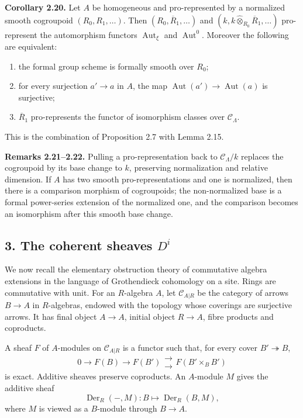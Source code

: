 \documentclass[11pt]{article}
\providecommand{\Aut}{\operatorname{Aut}}
\providecommand{\Der}{\operatorname{Der}}
\providecommand{\cC}{\mathcal C}
\begin{document}
\textbf{Corollary 2.20.}  Let \(A\) be homogeneous and pro-represented by a normalized smooth cogroupoid \((R_0,R_1,\ldots)\).  Then \((R_0,\overline R_1,\ldots)\) and \((k,k\widehat\otimes_{R_0}\overline R_1,\ldots)\) pro-represent the automorphism functors \(\Aut_\xi\) and \(\Aut^0\).  Moreover the following are equivalent:
\begin{enumerate}[label=\textup{(\roman*)}]
\item the formal group scheme is formally smooth over \(R_0\);
\item for every surjection \(a'\to a\) in \(A\), the map \(\Aut(a')\to\Aut(a)\) is surjective;
\item \(\overline R_1\) pro-represents the functor of isomorphism classes over \(\cC_\Lambda\).
\end{enumerate}
This is the combination of Proposition 2.7 with Lemma 2.15.

\textbf{Remarks 2.21--2.22.}  Pulling a pro-representation back to \(\cC_\Lambda/k\) replaces the cogroupoid by its base change to \(k\), preserving normalization and relative dimension.  If \(A\) has two smooth pro-representations and one is normalized, then there is a comparison morphism of cogroupoids; the non-normalized base is a formal power-series extension of the normalized one, and the comparison becomes an isomorphism after this smooth base change.

\subsection*{3. The coherent sheaves \(D^i\)}

We now recall the elementary obstruction theory of commutative algebra extensions in the language of Grothendieck cohomology on a site.  Rings are commutative with unit.  For an \(R\)-algebra \(A\), let \(\cC_{A|R}\) be the category of arrows \(B\to A\) in \(R\)-algebras, endowed with the topology whose coverings are surjective arrows.  It has final object \(A\to A\), initial object \(R\to A\), fibre products and coproducts.

A sheaf \(F\) of \(A\)-modules on \(\cC_{A|R}\) is a functor such that, for every cover \(B'\twoheadrightarrow B\),
\[
0\to F(B)\to F(B')\mathrel{\substack{\longrightarrow\\[-.6ex]\longrightarrow}} F(B'\times_B B')
\]
is exact.  Additive sheaves preserve coproducts.  An \(A\)-module \(M\) gives the additive sheaf
\[
 \Der_R(-,M):B\longmapsto \Der_R(B,M),
\]
where \(M\) is viewed as a \(B\)-module through \(B\to A\).
\end{document}
